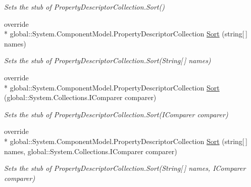 \begin{DoxyCompactItemize}
\begin{DoxyCompactList}\small\item\em Sets the stub of Property\-Descriptor\-Collection.\-Sort()\end{DoxyCompactList}\item 
override \\*
global\-::\-System.\-Component\-Model.\-Property\-Descriptor\-Collection \hyperlink{class_system_1_1_component_model_1_1_fakes_1_1_stub_property_descriptor_collection_adf68c8a16f08749c8a1a964d2718dd7a}{Sort} (string\mbox{[}$\,$\mbox{]} names)
\begin{DoxyCompactList}\small\item\em Sets the stub of Property\-Descriptor\-Collection.\-Sort(\-String\mbox{[}$\,$\mbox{]} names)\end{DoxyCompactList}\item 
override \\*
global\-::\-System.\-Component\-Model.\-Property\-Descriptor\-Collection \hyperlink{class_system_1_1_component_model_1_1_fakes_1_1_stub_property_descriptor_collection_a3bce8d64390c7a8d3ace29927ec94685}{Sort} (global\-::\-System.\-Collections.\-I\-Comparer comparer)
\begin{DoxyCompactList}\small\item\em Sets the stub of Property\-Descriptor\-Collection.\-Sort(\-I\-Comparer comparer)\end{DoxyCompactList}\item 
override \\*
global\-::\-System.\-Component\-Model.\-Property\-Descriptor\-Collection \hyperlink{class_system_1_1_component_model_1_1_fakes_1_1_stub_property_descriptor_collection_a23ad3c8ffe92946bd3dc0e3462d0af92}{Sort} (string\mbox{[}$\,$\mbox{]} names, global\-::\-System.\-Collections.\-I\-Comparer comparer)
\begin{DoxyCompactList}\small\item\em Sets the stub of Property\-Descriptor\-Collection.\-Sort(\-String\mbox{[}$\,$\mbox{]} names, I\-Comparer comparer)\end{DoxyCompactList}\end{DoxyCompactItemize}
